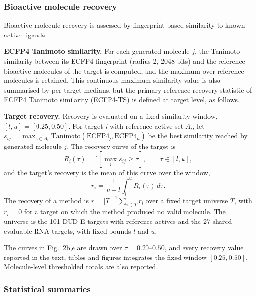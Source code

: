 \documentclass[pdflatex,sn-mathphys-num]{sn-jnl}
\theoremstyle{thmstyleone}
\theoremstyle{thmstyletwo}
\theoremstyle{thmstylethree}
\begin{document}
\subsubsection{Bioactive molecule recovery}

Bioactive molecule recovery is assessed by fingerprint-based similarity to known active ligands.

\medskip
\noindent\textbf{ECFP4 Tanimoto similarity.} For each generated molecule $j$, the Tanimoto similarity between its ECFP4 fingerprint (radius 2, 2048 bits) \cite{rogers2010ecfp} and the reference bioactive molecules of the target is computed, and the maximum over reference molecules is retained. This continuous maximum-similarity value is also summarised by per-target medians, but the primary reference-recovery statistic of ECFP4 Tanimoto similarity (ECFP4-TS) is defined at target level, as follows.

\medskip
\noindent\textbf{Target recovery.} Recovery is evaluated on a fixed similarity window, $[l,u]=[0.25,0.50]$. For target $i$ with reference active set $A_i$, let $s_{ij}=\max_{a\in A_i}\mathrm{Tanimoto}(\mathrm{ECFP4}_j,\mathrm{ECFP4}_a)$ be the best similarity reached by generated molecule $j$. The recovery curve of the target is
\begin{equation}
R_i(\tau)=\mathbb{I}\!\left[\max_j s_{ij}\ge\tau\right], \qquad \tau\in[l,u],
\label{eq:recovery_curve}
\end{equation}
and the target's recovery is the mean of this curve over the window,
\begin{equation}
r_i=\frac{1}{u-l}\int_l^u R_i(\tau)\,d\tau .
\label{eq:recovery}
\end{equation}
The recovery of a method is $\bar r=|T|^{-1}\sum_{i\in T}r_i$ over a fixed target universe $T$, with $r_i=0$ for a target on which the method produced no valid molecule. The universe is the 101 DUD-E targets with reference actives and the 27 shared evaluable RNA targets, with fixed bounds $l$ and $u$.

The curves in Fig.~2b,e are drawn over $\tau=0.20$--$0.50$, and every recovery value reported in the text, tables and figures integrates the fixed window $[0.25,0.50]$. Molecule-level thresholded totals are also reported.

\subsubsection{Statistical summaries}
\end{document}
